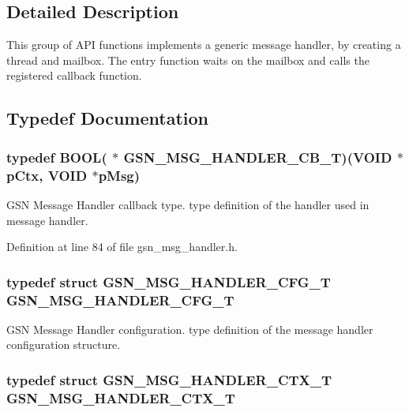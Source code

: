 \subsection{Detailed Description}
This group of API functions implements a generic message handler, by creating a thread and mailbox. The entry function waits on the mailbox and calls the registered callback function. 

\subsection{Typedef Documentation}
\hypertarget{a00627_ga638c4ec452bde3b70fae3b7239e05cca}{
\subsubsection[{GSN\_\-MSG\_\-HANDLER\_\-CB\_\-T}]{\setlength{\rightskip}{0pt plus 5cm}typedef {\bf BOOL}( $\ast$ {\bf GSN\_\-MSG\_\-HANDLER\_\-CB\_\-T})(VOID $\ast$pCtx, VOID $\ast$pMsg)}}
\label{a00627_ga638c4ec452bde3b70fae3b7239e05cca}


GSN Message Handler callback type. type definition of the handler used in message handler. 



Definition at line 84 of file gsn\_\-msg\_\-handler.h.

\hypertarget{a00627_gafb3b653c75d46a7789b82f2f3aff8321}{
\subsubsection[{GSN\_\-MSG\_\-HANDLER\_\-CFG\_\-T}]{\setlength{\rightskip}{0pt plus 5cm}typedef struct {\bf GSN\_\-MSG\_\-HANDLER\_\-CFG\_\-T}  {\bf GSN\_\-MSG\_\-HANDLER\_\-CFG\_\-T}}}
\label{a00627_gafb3b653c75d46a7789b82f2f3aff8321}


GSN Message Handler configuration. type definition of the message handler configuration structure. 

\hypertarget{a00627_gaf399ebe34f6e083a27eab240f852ac4d}{
\subsubsection[{GSN\_\-MSG\_\-HANDLER\_\-CTX\_\-T}]{\setlength{\rightskip}{0pt plus 5cm}typedef struct {\bf GSN\_\-MSG\_\-HANDLER\_\-CTX\_\-T}  {\bf GSN\_\-MSG\_\-HANDLER\_\-CTX\_\-T}}}
\label{a00627_gaf399ebe34f6e083a27eab240f852ac4d}


